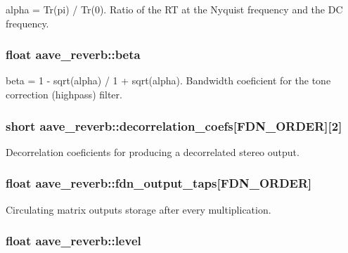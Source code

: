 alpha = Tr(pi) / Tr(0). Ratio of the R\-T at the Nyquist frequency and the D\-C frequency. \hypertarget{structaave__reverb_a7df2091982d7d299e1c657c015696bc7}{
\subsubsection[{beta}]{\setlength{\rightskip}{0pt plus 5cm}float aave\-\_\-reverb\-::beta}}\label{structaave__reverb_a7df2091982d7d299e1c657c015696bc7}
beta = 1 -\/ sqrt(alpha) / 1 + sqrt(alpha). Bandwidth coeficient for the tone correction (highpass) filter. \hypertarget{structaave__reverb_a2e40ddc7cc824ddf535c1e80fb1145d5}{
\subsubsection[{decorrelation\-\_\-coefs}]{\setlength{\rightskip}{0pt plus 5cm}short aave\-\_\-reverb\-::decorrelation\-\_\-coefs\mbox{[}{\bf F\-D\-N\-\_\-\-O\-R\-D\-E\-R}\mbox{]}\mbox{[}2\mbox{]}}}\label{structaave__reverb_a2e40ddc7cc824ddf535c1e80fb1145d5}
Decorrelation coeficients for producing a decorrelated stereo output. \hypertarget{structaave__reverb_a1236e5a13384cac788a3f255cf0b9628}{
\subsubsection[{fdn\-\_\-output\-\_\-taps}]{\setlength{\rightskip}{0pt plus 5cm}float aave\-\_\-reverb\-::fdn\-\_\-output\-\_\-taps\mbox{[}{\bf F\-D\-N\-\_\-\-O\-R\-D\-E\-R}\mbox{]}}}\label{structaave__reverb_a1236e5a13384cac788a3f255cf0b9628}
Circulating matrix outputs storage after every multiplication. \hypertarget{structaave__reverb_a7d35fe8d4163e93cf8a54779151a17bf}{
\subsubsection[{level}]{\setlength{\rightskip}{0pt plus 5cm}float aave\-\_\-reverb\-::level}}\label{structaave__reverb_a7d35fe8d4163e93cf8a54779151a17bf}

